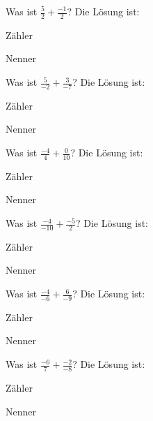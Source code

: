 \documentclass{ximera}
\begin{document}
\begin{shuffle}
\begin{question}
Was ist $\frac{5}{2} + \frac{-1}{2}$?
Die Lösung ist:
\begin{solution}
Zähler 
\end{solution}
\begin{solution}
Nenner 
\end{solution}
\end{question}


\begin{question}
Was ist $\frac{5}{-2} + \frac{3}{-7}$?
Die Lösung ist:
\begin{solution}
Zähler 
\end{solution}
\begin{solution}
Nenner 
\end{solution}
\end{question}


\begin{question}
Was ist $\frac{-4}{4} + \frac{0}{10}$?
Die Lösung ist:
\begin{solution}
Zähler 
\end{solution}
\begin{solution}
Nenner 
\end{solution}
\end{question}


\begin{question}
Was ist $\frac{-4}{-10} + \frac{-5}{2}$?
Die Lösung ist:
\begin{solution}
Zähler 
\end{solution}
\begin{solution}
Nenner 
\end{solution}
\end{question}


\begin{question}
Was ist $\frac{-4}{-6} + \frac{6}{-9}$?
Die Lösung ist:
\begin{solution}
Zähler 
\end{solution}
\begin{solution}
Nenner 
\end{solution}
\end{question}


\begin{question}
Was ist $\frac{-6}{7} + \frac{-2}{-8}$?
Die Lösung ist:
\begin{solution}
Zähler 
\end{solution}
\begin{solution}
Nenner 
\end{solution}
\end{question}



\end{shuffle}
\end{document}
